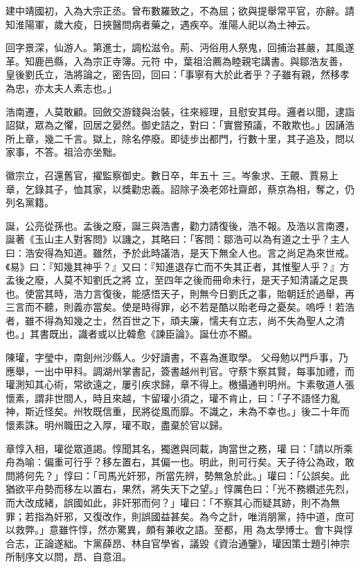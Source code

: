 \begin{pinyinscope}
 建中靖國初，入為大宗正丞。曾布數羅致之，不為屈；欲與提舉常平官，亦辭。請知淮陽軍，歲大疫，日挾醫問病者藥之，遇疾卒。淮陽人祀以為土神云。



 回字景深，仙游人。第進士，調松滋令。荊、沔俗用人祭鬼，回捕治甚嚴，其風遂革。知鹿邑縣，入為宗正寺簿。元符
 中，葉祖洽薦為睦親宅講書。與鄒浩友善，皇後劉氏立，浩將論之，密告回，回曰：「事寧有大於此者乎？子雖有親，然移孝為忠，亦太夫人素志也。」



 浩南遷，人莫敢顧。回斂交游錢與治裝，往來經理，且慰安其母。邏者以聞，逮詣詔獄，眾為之懼，回居之晏然。御史詰之，對曰：「實嘗預議，不敢欺也。」因誦浩所上章，幾二千言。獄上，除名停廢。即徒步出都門，行數十里，其子追及，問以家事，不答。祖洽亦坐黜。



 徽宗立，召還舊官，擢監察御史。數日卒，年五十
 三。岑象求、王覿、賈易上章，乞錄其子，恤其家，以獎勸忠義。詔除子渙老郊社齋郎，蔡京為相，奪之，仍列名黨籍。



 誕，公亮從孫也。孟後之廢，誕三與浩書，勸力請復後，浩不報。及浩以言南遷，誕著《玉山主人對客問》以譏之，其略曰：「客問：鄒浩可以為有道之士乎？主人曰：浩安得為知道。雖然，予於此時議浩，是天下無全人也。言之尚足為來世戒。《易》曰：『知幾其神乎？』又曰：『知進退存亡而不失其正者，其惟聖人乎？』方孟後之廢，人莫不知劉氏之將
 立，至四年之後而冊命未行，是天子知清議之足畏也。使當其時，浩力言復後，能感悟天子，則無今日劉氏之事，貽朝廷於過舉，再三言而不聽，則義亦當矣。使是時得罪，必不若是酷以貽老母之憂矣。嗚呼！若浩者，雖不得為知幾之士，然百世之下，頑夫廉，懦夫有立志，尚不失為聖人之清也。」其書既出，識者或以比韓愈《諫臣論》。誕仕亦不顯。



 陳瓘，字瑩中，南劍州沙縣人。少好讀書，不喜為進取學。
 父母勉以門戶事，乃應舉，一出中甲科。調湖州掌書記，簽書越州判官。守蔡卞察其賢，每事加禮，而瓘測知其心術，常欲遠之，屢引疾求歸，章不得上。檄攝通判明州。卞素敬道人張懷素，謂非世間人，時且來越，卞留瓘小須之，瓘不肯止，曰：「子不語怪力亂神，斯近怪矣。州牧既信重，民將從風而靡。不識之，未為不幸也。」後二十年而懷素誅。明州職田之入厚，瓘不取，盡棄於官以歸。



 章惇入相，瓘從眾道謁。惇聞其名，獨邀與同載，詢當世之務，瓘
 曰：「請以所乘舟為喻：偏重可行乎？移左置右，其偏一也。明此，則可行矣。天子待公為政，敢問將何先？」惇曰：「司馬光奸邪，所當先辨，勢無急於此。」瓘曰：「公誤矣。此猶欲平舟勢而移左以置右，果然，將失天下之望。」惇厲色曰：「光不務纘述先烈，而大改成緒，誤國如此，非奸邪而何？」瓘曰：「不察其心而疑其跡，則不為無罪；若指為奸邪，又復改作，則誤國益甚矣。為今之計，唯消朋黨，持中道，庶可以救弊。」意雖忤惇，然亦驚異，頗有兼收之語。至都，用
 為太學博士。會卞與惇合志，正論遂絀。卞黨薛昂、林自官學省，議毀《資治通鑒》，瓘因策士題引神宗所制序文以問，昂、自意沮。




\end{pinyinscope}

